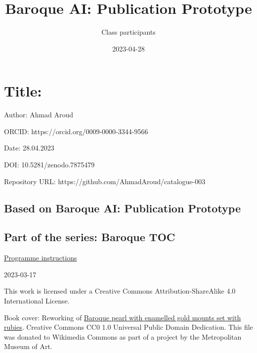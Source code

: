 \documentclass[
  letterpaper,
]{book}
\title{Baroque AI: Publication Prototype}
\author{Class participants}
\date{2023-04-28}
\renewcommand*\contentsname{Table of contents}
\newcommand\contentsname{Table of contents}
\begin{document}
\frontmatter
\maketitle
\ifdefined\Shaded\renewenvironment{Shaded}{\begin{tcolorbox}[borderline west={3pt}{0pt}{shadecolor}, frame hidden, boxrule=0pt, interior hidden, breakable, sharp corners, enhanced]}{\end{tcolorbox}}\fi

\renewcommand*\contentsname{Table of contents}
{
\setcounter{tocdepth}{2}
\tableofcontents
}
\mainmatter
{}

\hypertarget{title}{%
\chapter{Title:}\label{title}}

Author: Ahmad Aroud

ORCID: https://orcid.org/0009-0000-3344-9566

Date: 28.04.2023

DOI: 10.5281/zenodo.7875479

Repository URL: https://github.com/AhmadAroud/catalogue-003

\hypertarget{based-on-baroque-ai-publication-prototype}{%
\section{Based on Baroque AI: Publication
Prototype}\label{based-on-baroque-ai-publication-prototype}}

\hypertarget{part-of-the-series-baroque-toc}{%
\section{Part of the series: Baroque
TOC}\label{part-of-the-series-baroque-toc}}

\href{https://nfdi4culture.github.io/class-ADA-CP-pipeline/}{Programme
instructions}

2023-03-17

This work is licensed under a Creative Commons Attribution-ShareAlike
4.0 International License.

Book cover: Reworking of
\href{https://en.wikipedia.org/wiki/File:Pendant_in_the_form_of_a_siren_MET_DT7173.jpg}{Baroque
pearl with enamelled gold mounts set with rubies}. Creative Commons CC0
1.0 Universal Public Domain Dedication. This file was donated to
Wikimedia Commons as part of a project by the Metropolitan Museum of
Art.
\end{document}
